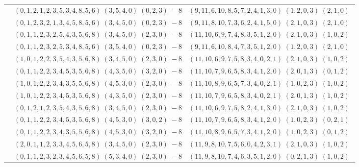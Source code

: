 \documentclass[11pt]{article}
\begin{document}
\begin{longtable}[l]{|c|c|c|}
 \cline{2-3} 
 & $(0 ,1 ,2 ,1 ,2 ,3 ,5 ,3 ,4 ,8 ,5 ,6) \;(3 ,5 ,4 ,0) \;(0 ,2 ,3) \;-8$ & $(9 ,11 ,6 ,10 ,8 ,5 ,7 ,2 ,4 ,1 ,3 ,0) \;(1 ,2 ,0 ,3) \;(2 ,1 ,0) \;$\\ 
 \cline{2-3} 
 & $(0 ,1 ,2 ,3 ,2 ,1 ,3 ,4 ,5 ,8 ,5 ,6) \;(3 ,4 ,5 ,0) \;(0 ,2 ,3) \;-8$ & $(9 ,11 ,8 ,10 ,7 ,3 ,6 ,2 ,4 ,1 ,5 ,0) \;(2 ,1 ,0 ,3) \;(2 ,1 ,0) \;$\\ 
 \cline{2-3} 
 & $(0 ,1 ,1 ,2 ,3 ,2 ,5 ,4 ,3 ,5 ,6 ,8) \;(3 ,4 ,5 ,0) \;(2 ,3 ,0) \;-8$ & $(11 ,10 ,6 ,9 ,7 ,4 ,8 ,3 ,5 ,1 ,2 ,0) \;(2 ,1 ,0 ,3) \;(1 ,0 ,2) \;$\\ 
 \cline{2-3} 
 & $(0 ,1 ,1 ,2 ,3 ,2 ,5 ,3 ,4 ,8 ,5 ,6) \;(3 ,5 ,4 ,0) \;(0 ,2 ,3) \;-8$ & $(9 ,11 ,6 ,10 ,8 ,4 ,7 ,3 ,5 ,1 ,2 ,0) \;(1 ,2 ,0 ,3) \;(2 ,1 ,0) \;$\\ 
 \cline{2-3} 
 & $(1 ,0 ,1 ,2 ,2 ,3 ,5 ,4 ,3 ,5 ,6 ,8) \;(3 ,4 ,5 ,0) \;(2 ,3 ,0) \;-8$ & $(11 ,10 ,6 ,9 ,7 ,5 ,8 ,3 ,4 ,0 ,2 ,1) \;(2 ,1 ,0 ,3) \;(1 ,0 ,2) \;$\\ 
 \cline{2-3} 
 & $(0 ,1 ,1 ,2 ,2 ,3 ,4 ,5 ,3 ,5 ,6 ,8) \;(4 ,3 ,5 ,0) \;(3 ,2 ,0) \;-8$ & $(11 ,10 ,7 ,9 ,6 ,5 ,8 ,3 ,4 ,1 ,2 ,0) \;(2 ,0 ,1 ,3) \;(0 ,1 ,2) \;$\\ 
 \cline{2-3} 
 & $(1 ,0 ,1 ,2 ,2 ,3 ,4 ,3 ,5 ,5 ,6 ,8) \;(4 ,5 ,3 ,0) \;(2 ,3 ,0) \;-8$ & $(11 ,10 ,8 ,9 ,6 ,5 ,7 ,3 ,4 ,0 ,2 ,1) \;(1 ,0 ,2 ,3) \;(1 ,0 ,2) \;$\\ 
 \cline{2-3} 
 & $(1 ,0 ,1 ,2 ,2 ,3 ,4 ,5 ,3 ,5 ,6 ,8) \;(4 ,3 ,5 ,0) \;(2 ,3 ,0) \;-8$ & $(11 ,10 ,7 ,9 ,6 ,5 ,8 ,3 ,4 ,0 ,2 ,1) \;(2 ,0 ,1 ,3) \;(1 ,0 ,2) \;$\\ 
 \cline{2-3} 
 & $(0 ,1 ,2 ,1 ,2 ,3 ,5 ,4 ,3 ,5 ,6 ,8) \;(3 ,4 ,5 ,0) \;(2 ,3 ,0) \;-8$ & $(11 ,10 ,6 ,9 ,7 ,5 ,8 ,2 ,4 ,1 ,3 ,0) \;(2 ,1 ,0 ,3) \;(1 ,0 ,2) \;$\\ 
 \cline{2-3} 
 & $(0 ,1 ,1 ,2 ,2 ,3 ,4 ,5 ,3 ,5 ,6 ,8) \;(4 ,5 ,3 ,0) \;(3 ,0 ,2) \;-8$ & $(11 ,10 ,7 ,9 ,6 ,5 ,8 ,3 ,4 ,1 ,2 ,0) \;(1 ,0 ,2 ,3) \;(0 ,2 ,1) \;$\\ 
 \cline{2-3} 
 & $(0 ,1 ,1 ,2 ,2 ,3 ,4 ,3 ,5 ,5 ,6 ,8) \;(4 ,5 ,3 ,0) \;(3 ,2 ,0) \;-8$ & $(11 ,10 ,8 ,9 ,6 ,5 ,7 ,3 ,4 ,1 ,2 ,0) \;(1 ,0 ,2 ,3) \;(0 ,1 ,2) \;$\\ 
 \cline{2-3} 
 & $(2 ,0 ,1 ,1 ,2 ,3 ,3 ,4 ,5 ,6 ,5 ,8) \;(3 ,4 ,5 ,0) \;(2 ,3 ,0) \;-8$ & $(11 ,9 ,8 ,10 ,7 ,5 ,6 ,0 ,4 ,2 ,3 ,1) \;(2 ,1 ,0 ,3) \;(1 ,0 ,2) \;$\\ 
 \cline{2-3} 
 & $(0 ,1 ,1 ,2 ,3 ,2 ,3 ,4 ,5 ,6 ,5 ,8) \;(5 ,3 ,4 ,0) \;(2 ,3 ,0) \;-8$ & $(11 ,9 ,8 ,10 ,7 ,4 ,6 ,3 ,5 ,1 ,2 ,0) \;(0 ,2 ,1 ,3) \;(1 ,0 ,2) \;$\\ 

\end{longtable}
\end{document}
